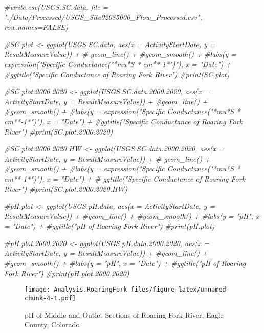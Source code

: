 \documentclass[]{article}
\newenvironment{Shaded}{\begin{snugshade}}{\end{snugshade}}
\newcommand{\CommentTok}[1]{\textcolor[rgb]{0.56,0.35,0.01}{\textit{#1}}}
\begin{document}
\begin{Shaded}
\begin{Highlighting}[]
\CommentTok{#write.csv(USGS.SC.data, file = "./Data/Processed/USGS_Site02085000_Flow_Processed.csv", row.names=FALSE)}
\end{Highlighting}
\end{Shaded}

\begin{Shaded}
\begin{Highlighting}[]
\CommentTok{#SC.plot <- ggplot(USGS.SC.data, aes(x = ActivityStartDate, y = ResultMeasureValue)) +}
 \CommentTok{# geom_line() +}
  \CommentTok{#geom_smooth() +}
  \CommentTok{#labs(y = expression("Specific Conductance("*mu*S * cm**-1*")"), x = "Date") +}
    \CommentTok{#ggtitle("Specific Conductance of Roaring Fork River")}
\CommentTok{#print(SC.plot)}


\CommentTok{#SC.plot.2000.2020 <- ggplot(USGS.SC.data.2000.2020, aes(x = ActivityStartDate, y = ResultMeasureValue)) +}
  \CommentTok{#geom_line() +}
  \CommentTok{#geom_smooth() +}
  \CommentTok{#labs(y = expression("Specific Conductance("*mu*S * cm**-1*")"), x = "Date") +}
    \CommentTok{#ggtitle("Specific Conductance of Roaring Fork River")}
\CommentTok{#print(SC.plot.2000.2020)}

\CommentTok{#SC.plot.2000.2020.HW <- ggplot(USGS.SC.data.2000.2020, aes(x = ActivityStartDate, y = ResultMeasureValue)) +}
 \CommentTok{# geom_line() +}
  \CommentTok{#geom_smooth() +}
  \CommentTok{#labs(y = expression("Specific Conductance("*mu*S * cm**-1*")"), x = "Date") +}
   \CommentTok{# ggtitle("Specific Conductance of Roaring Fork River")}
\CommentTok{#print(SC.plot.2000.2020.HW)}

\CommentTok{#pH.plot <- ggplot(USGS.pH.data, aes(x = ActivityStartDate, y = ResultMeasureValue)) +}
  \CommentTok{#geom_line() +}
  \CommentTok{#geom_smooth() +}
  \CommentTok{#labs(y = "pH", x = "Date") +}
    \CommentTok{#ggtitle("pH of Roaring Fork River")}
\CommentTok{#print(pH.plot)}

\CommentTok{#pH.plot.2000.2020 <- ggplot(USGS.pH.data.2000.2020, aes(x = ActivityStartDate, y = ResultMeasureValue)) +}
  \CommentTok{#geom_line() +}
  \CommentTok{#geom_smooth() +}
  \CommentTok{#labs(y = "pH", x = "Date") +}
    \CommentTok{#ggtitle("pH of Roaring Fork River")}
\CommentTok{#print(pH.plot.2000.2020)}
\end{Highlighting}
\end{Shaded}

\begin{figure}
\centering
\texttt{[image: Analysis.RoaringFork\_files/figure-latex/unnamed-chunk-4-1.pdf]}
\caption{pH of Middle and Outlet Sections of Roaring Fork River, Eagle
County, Colorado}
\end{figure}
\end{document}
